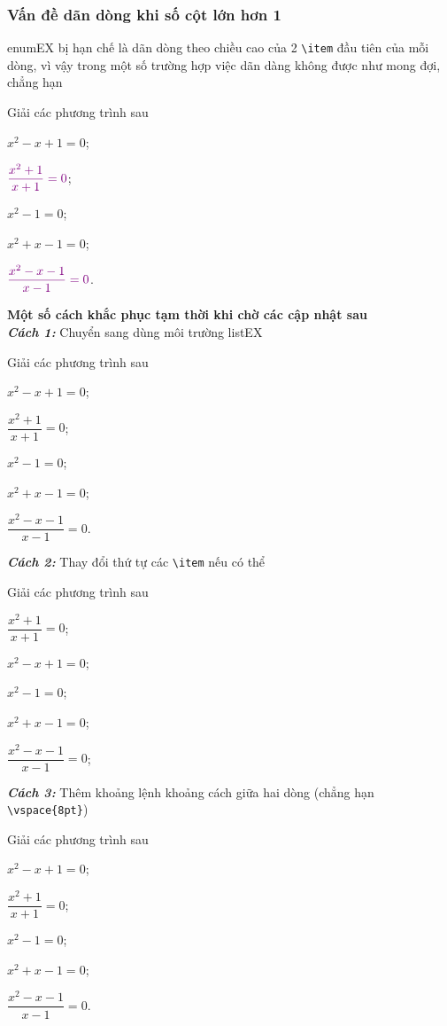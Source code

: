 \documentclass[12pt,a4paper,oneside]{article}
\begin{document}
\subsubsection{Vấn đề dãn dòng khi số cột lớn hơn 1}
enumEX bị hạn chế là dãn dòng theo chiều cao của 2 \verb+\item+ đầu tiên của mỗi dòng, vì vậy trong một số trường hợp việc dãn dàng không được như mong đợi, chẳng hạn
\begin{ex}
Giải các phương trình sau
\begin{enumEX}{3}
\item $x^2-x+1=0$;
\item $\color{violet}\dfrac{x^2+1}{x+1}=0$;
\item $x^2-1=0$;
\item $x^2+x-1=0$;
\item $\color{violet}\dfrac{x^2-x-1}{x-1}=0$.
\end{enumEX}
\end{ex}
\textbf{Một số cách khắc phục tạm thời khi chờ các cập nhật sau}\\
\textbf{\textit{Cách 1:}} Chuyển sang dùng môi trường listEX
\begin{ex}
Giải các phương trình sau
\begin{listEX}[3]
\item $x^2-x+1=0$;
\item $\dfrac{x^2+1}{x+1}=0$;
\item $x^2-1=0$;
\item $x^2+x-1=0$;
\item $\dfrac{x^2-x-1}{x-1}=0$.
\end{listEX}
\end{ex}
\textbf{\textit{Cách 2:}} Thay đổi thứ tự các \verb+\item+ nếu có thể
\begin{ex}
Giải các phương trình sau
\begin{enumEX}{3}
\item $\dfrac{x^2+1}{x+1}=0$;
\item $x^2-x+1=0$;
\item $x^2-1=0$;
\item $x^2+x-1=0$;
\item $\dfrac{x^2-x-1}{x-1}=0$;
\end{enumEX}
\end{ex}
\textbf{\textit{Cách 3:}} Thêm khoảng lệnh khoảng cách giữa hai dòng (chẳng hạn \verb+\vspace{8pt}+)
\begin{ex}
Giải các phương trình sau
\begin{enumEX}{3}
\item $x^2-x+1=0$;
\item $\dfrac{x^2+1}{x+1}=0$;
\item $x^2-1=0$;\vspace{8pt}
\item $x^2+x-1=0$;
\item $\dfrac{x^2-x-1}{x-1}=0$.
\end{enumEX}
\end{ex}
\end{document}
